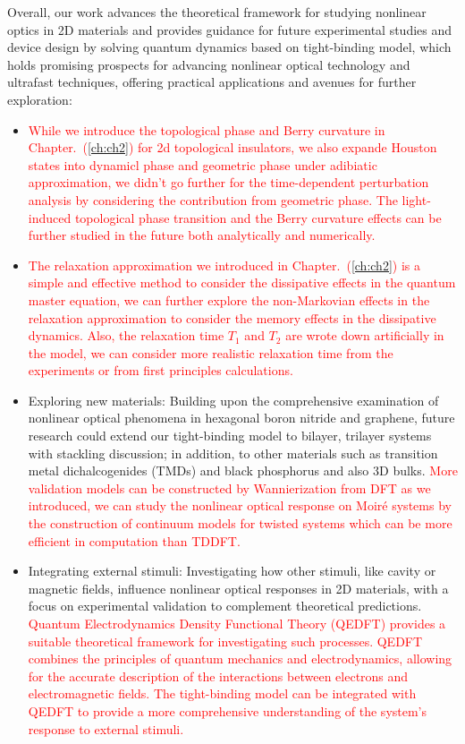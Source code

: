 \color{black}
Overall, our work advances the theoretical framework for studying nonlinear optics in 2D materials and provides guidance for future experimental studies and device design by solving quantum dynamics based on tight-binding model, which holds promising prospects for advancing nonlinear optical technology and ultrafast techniques, offering practical applications and avenues for further exploration:
\begin{itemize}
	\item \textcolor{red}{While we introduce the topological phase and Berry curvature in Chapter.~(\ref{ch:ch2}) for 2d topological insulators, we also expande Houston states into dynamicl phase and geometric phase under adibiatic approximation, we didn't go further for the time-dependent perturbation analysis by considering the contribution from geometric phase. The light-induced topological phase transition and the Berry curvature effects can be further studied in the future both analytically and numerically.}

	\item \textcolor{red}{The relaxation approximation we introduced in Chapter.~(\ref{ch:ch2}) is a simple and effective method to consider the dissipative effects in the quantum master equation, we can further explore the non-Markovian effects in the relaxation approximation to consider the memory effects in the dissipative dynamics. Also, the relaxation time $T_1$ and $T_2$ are wrote down artificially in the model, we can consider more realistic relaxation time from the experiments or from first principles calculations.}

	\item Exploring new materials: Building upon the comprehensive examination of nonlinear optical phenomena in hexagonal boron nitride and graphene, future research could extend our tight-binding model to bilayer, trilayer systems with stackling discussion; in addition, to other materials such as transition metal dichalcogenides (TMDs) and black phosphorus and also 3D bulks. \textcolor{red}{More validation models can be constructed by Wannierization from DFT as we introduced, we can study the nonlinear optical response on Moiré systems by the construction of continuum models for twisted systems which can be more efficient in computation than \gls{TDDFT}.}

	\item Integrating external stimuli: Investigating how other stimuli, like cavity or magnetic fields, influence nonlinear optical responses in 2D materials, with a focus on experimental validation to complement theoretical predictions. \textcolor{red}{Quantum Electrodynamics Density Functional Theory (QEDFT) provides a suitable theoretical framework for investigating such processes. QEDFT combines the principles of quantum mechanics and electrodynamics, allowing for the accurate description of the interactions between electrons and electromagnetic fields. The tight-binding model can be integrated with QEDFT to provide a more comprehensive understanding of the system's response to external stimuli.}


\end{itemize}
